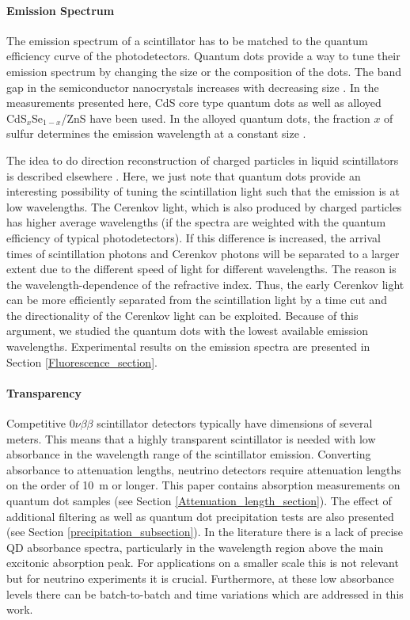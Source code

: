 \documentclass[cits]{JINST}
\begin{document}
\paragraph{Emission Spectrum}
The emission spectrum of a scintillator has to be matched to the quantum efficiency curve of the photodetectors. Quantum dots provide a way to tune their emission spectrum by changing the size or the composition of the dots. The band gap in the semiconductor nanocrystals increases with decreasing size \cite{alivisatos1996}. In the measurements presented here, CdS core type quantum dots as well as alloyed CdS$_x$Se$_{1-x}$/ZnS have been used. In the alloyed quantum dots, the fraction $x$ of sulfur determines the emission wavelength at a constant size \cite{swafford2006}. 

The idea to do direction reconstruction of charged particles in liquid scintillators is described elsewhere \cite{mitpaper,simpaper}. Here, we just note that quantum dots provide an interesting possibility of tuning the scintillation light such that the emission is at low wavelengths. The Cerenkov light, which is also produced by charged particles has higher average wavelengths (if the spectra are weighted with the quantum efficiency of typical photodetectors). If this difference is increased, the arrival times of scintillation photons and Cerenkov photons will be separated to a larger extent due to the different speed of light for different wavelengths. The reason is the wavelength-dependence of the refractive index. Thus, the early Cerenkov light can be more efficiently separated from the scintillation light by a time cut and the directionality of the Cerenkov light can be exploited. Because of this argument, we studied the quantum dots with the lowest available emission wavelengths. Experimental results on the emission spectra are presented in Section \ref{Fluorescence_section}. 

\paragraph{Transparency}
Competitive 0$\nu\beta\beta$ scintillator detectors typically have dimensions of several meters. This means that a highly transparent scintillator is needed with low absorbance in the wavelength range of the scintillator emission. Converting absorbance to attenuation lengths, neutrino detectors require attenuation lengths on the order of 10~m or longer. This paper contains absorption measurements on quantum dot samples (see Section \ref{Attenuation_length_section}). The effect of additional filtering as well as quantum dot precipitation tests are also presented (see Section \ref{precipitation_subsection}). In the literature there is a lack of precise QD absorbance spectra, particularly in the wavelength region above the main excitonic absorption peak. For applications on a smaller scale this is not relevant but for neutrino experiments it is crucial. Furthermore, at these low absorbance levels there can be batch-to-batch and time variations which are addressed in this work.  
\end{document}
